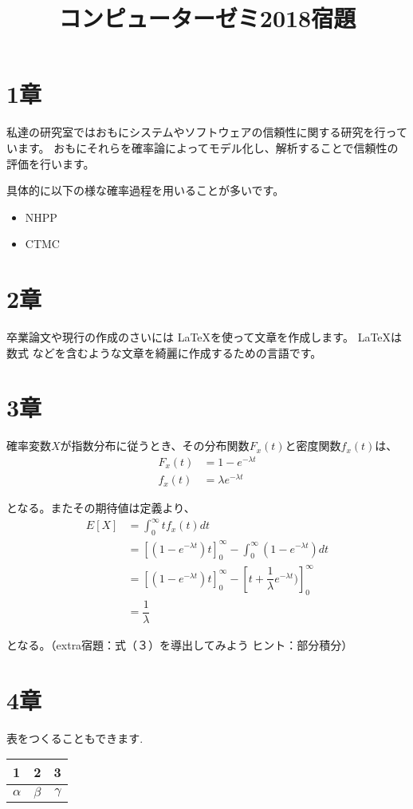 \documentclass[a4paper,12pt]{article}
\title{コンピューターゼミ2018宿題}
\begin{document}
\maketitle
\section{1章}
\par 私達の研究室ではおもにシステムやソフトウェアの信頼性に関する研究を行っています。
おもにそれらを確率論によってモデル化し、解析することで信頼性の評価を行います。
\par    具体的に以下の様な確率過程を用いることが多いです。
\begin{itemize}
    \item NHPP
    \item CTMC
\end{itemize}

\section{2章}
\par 卒業論文や現行の作成のさいには \LaTeX を使って文章を作成します。 \LaTeX は数式
などを含むような文章を綺麗に作成するための言語です。

\section{3章}
\par 確率変数$X$が指数分布に従うとき、その分布関数$F_x(t)$と密度関数$f_x(t)$は、
\begin{align}
F_x(t)&= 1-e^{-\lambda t} \\
f_x(t)&=\lambda e^{-\lambda t}
\end{align}
\par となる。またその期待値は定義より、
\begin{equation}
\begin{split}
E[X]&= \int_0^\infty tf_x(t)dt \\
&=[(1-e^{-\lambda t})t]^\infty_{0}-\int_0^{\infty}(1-e^{-\lambda t})dt \\
&=[(1-e^{-\lambda t})t]^\infty_{0}-[t+\dfrac{1}{\lambda}e^{-\lambda t})]^\infty_{0} \\
&=\dfrac{1}{\lambda}
\end{split}
\end{equation}
\par となる。（extra宿題：式（３）を導出してみよう ヒント：部分積分）

\section{4章}
\par 表をつくることもできます.


\centering
\begin{tabular}{|l|c|r|}
\hline
1 & 2 & 3 \\
\hline
$\alpha$ & $\beta$ & $\gamma$ \\
\hline
\end{tabular}
\end{document}
